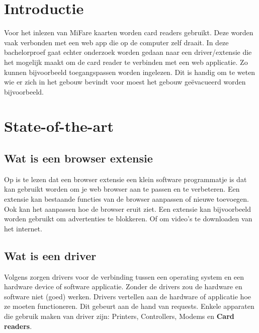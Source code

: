 
\section{Introductie}%
\label{sec:introductie}

Voor het inlezen van MiFare kaarten worden card readers gebruikt. Deze worden vaak verbonden met een web app die op de computer zelf draait. In deze bachelorproef gaat echter onderzoek worden gedaan naar een driver/extensie die het mogelijk maakt om de card reader te verbinden met een web applicatie. Zo kunnen bijvoorbeeld toegangspassen worden ingelezen. Dit is handig om te weten wie er zich in het gebouw bevindt voor moest het gebouw geëvacueerd worden bijvoorbeeld.


\section{State-of-the-art}%
\label{sec:state-of-the-art}

\subsection{Wat is een browser extensie}
Op \textcite{Desktop.com} is te lezen dat een browser extensie een klein software programmatje is dat kan gebruikt worden om je web browser aan te passen en te verbeteren. Een extensie kan bestaande functies van de browser aanpassen of nieuwe toevoegen. Ook kan het aanpassen hoe de browser eruit ziet.
Een extensie kan bijvoorbeeld worden gebruikt om advertenties te blokkeren. Of om video's te downloaden van het internet.

\subsection{Wat is een driver}
Volgens \textcite{Webopedia} zorgen drivers voor de verbinding tussen een operating system en een hardware device of software applicatie. Zonder de drivers zou de hardware en software niet (goed) werken. Drivers vertellen aan de hardware of applicatie hoe ze moeten functioneren. Dit gebeurt aan de hand van requests. Enkele apparaten die gebruik maken van driver zijn: Printers, Controllers, Modems en \textbf{Card readers}.

